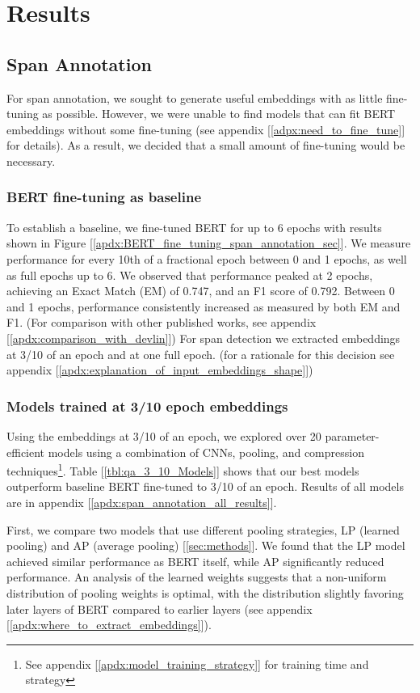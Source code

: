 \section{Results}

\subsection{Span Annotation}
For span annotation, we sought to generate useful embeddings with as little fine-tuning as possible. However, we were unable to find models that can fit BERT embeddings without some fine-tuning (see appendix [\ref{adpx:need_to_fine_tune}] for details). As a result, we decided that a small amount of fine-tuning would be necessary.

\subsubsection{BERT fine-tuning as baseline}
To establish a baseline, we fine-tuned BERT for up to 6 epochs with results shown in Figure [\ref{apdx:BERT_fine_tuning_span_annotation_sec}]. We measure performance for every 10th of a fractional epoch between 0 and 1 epochs, as well as full epochs up to 6. We observed that performance peaked at 2 epochs, achieving an Exact Match (EM) of 0.747, and an F1 score of 0.792. Between 0 and 1 epochs, performance consistently increased as measured by  both EM and F1. (For comparison with other published works, see appendix [\ref{apdx:comparison_with_devlin}]) For span detection we extracted embeddings at 3/10 of an epoch and at one full epoch. (for a rationale for this decision see appendix [\ref{apdx:explanation_of_input_embeddings_shape}])

\subsubsection{Models trained at 3/10 epoch embeddings}
Using the embeddings at 3/10 of an epoch, we explored over 20 parameter-efficient models using a combination of CNNs, pooling, and compression techniques\footnote{See appendix [\ref{apdx:model_training_strategy}] for training time and strategy}. Table [\ref{tbl:qa_3_10_Models}] shows that our best models outperform baseline BERT fine-tuned to 3/10 of an epoch. Results of all models are in appendix [\ref{apdx:span_annotation_all_results}].

First, we compare two models that use different pooling strategies, LP (learned pooling) and AP (average pooling) [\ref{sec:methods}]. We found that the LP model achieved similar performance as BERT itself, while AP significantly reduced performance. An analysis of the learned weights suggests that a non-uniform distribution of pooling weights is optimal, with the distribution slightly favoring later layers of BERT compared to earlier layers (see appendix [\ref{apdx:where_to_extract_embeddings}]).

